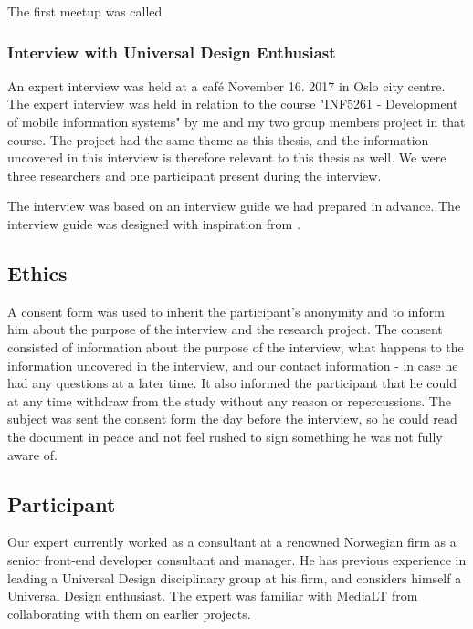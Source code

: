 The first meetup was called 









\subsubsection{Interview with Universal Design Enthusiast}
An expert interview was held at a café November 16. 2017 in Oslo city centre. The expert interview was held in relation to the course "INF5261 - Development of mobile information systems" by me and my two group members project in that course. The project had the same theme as this thesis, and the information uncovered in this interview is therefore relevant to this thesis as well. We were three researchers and one participant present during the interview.

The interview was based on an interview guide we had prepared in advance. The interview guide was designed with inspiration from \textcite{tone_nordbo_introduksjon_2017}.

\subsection{Ethics}
A consent form was used to inherit the participant's anonymity and to inform him about the purpose of the interview and the research project. The consent consisted of information about the purpose of the interview, what happens to the information uncovered in the interview, and our contact information - in case he had any questions at a later time. It also informed the participant that he could at any time withdraw from the study without any reason or repercussions. The subject was sent the consent form the day before the interview, so he could read the document in peace and not feel rushed to sign something he was not fully aware of.

\subsection{Participant}
Our expert currently worked as a consultant at a renowned Norwegian firm as a senior front-end developer consultant and manager. He has previous experience in leading a Universal Design disciplinary group at his firm, and considers himself a Universal Design enthusiast. The expert was familiar with MediaLT from collaborating with them on earlier projects.

